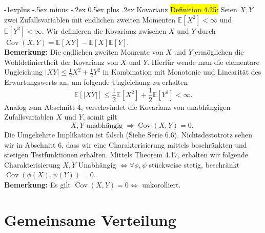 \documentclass[10pt,landscape]{article}
\makeatletter
\newcommand{\blue}[1]{\sethlcolor{cyan} \hl{#1}}
\renewcommand{\subsection}{\@startsection{subsection}{1}{0mm}%
                                {-1ex plus -.5ex minus -.2ex}%
                                {0.5ex plus .2ex}%
                                {\normalfont\large\bfseries}}
\renewcommand{\subsection}{\@startsection{subsection}{2}{0mm}%
                                {-1explus -.5ex minus -.2ex}%
                                {0.5ex plus .2ex}%
                                {\normalfont\normalsize\bfseries}}
\makeatother
\begin{document}
\begin{multicols}{3}
\subsection{Kovarianz}
\blue{Definition 4.25:} Seien $X, Y$ zwei Zufallsvariablen mit endlichen zweiten Momenten $\mathbb{E}\left[X^{2}\right]<\infty$ und $\mathbb{E}\left[Y^{2}\right]<\infty$. Wir definieren die Kovarianz zwischen $X$ und $Y$ durch
$\operatorname{Cov}(X, Y)=\mathbb{E}[X Y]-\mathbb{E}[X] \mathbb{E}[Y]$. \\
\textbf{Bemerkung:} Die endlichen zweiten Momente von $X$ und $Y$ ermöglichen die Wohldefiniertheit der Kovarianz von $X$ und $Y$. Hierfür wende man die elementare Ungleichung $|X Y| \leq \frac{1}{2} X^{2}+\frac{1}{2} Y^{2}$ in Kombination mit Monotonie und Linearität des Erwartungswerts an, um folgende Ungleichung zu erhalten
$$
\mathbb{E}[|X Y|] \leq \frac{1}{2} \mathbb{E}\left[X^{2}\right]+\frac{1}{2} \mathbb{E}\left[Y^{2}\right]<\infty .
$$
Analog zum Abschnitt 4, verschwindet die Kovarianz von unabhängigen Zufallsvariablen $X$ und $Y$, somit gilt
$$
X, Y \text { unabhängig } \Longrightarrow \operatorname{Cov}(X, Y)=0 \text {. }
$$
Die Umgekehrte Implikation ist falsch (Siehe Serie 6.6). Nichtsdestotrotz sehen wir in Abschnitt 6, dass wir eine Charakterisierung mittels beschränkten und stetigen Testfunktionen erhalten. Mittels Theorem 4.17, erhalten wir folgende Charakterisierung
$X, Y$ Unabhängig $\Longleftrightarrow \forall \phi, \psi$ stückweise stetig, beschränkt $\operatorname{Cov}(\phi(X), \psi(Y))=0$. \\
\textbf{Bemerkung: } Es gilt $\operatorname{Cov}(X, Y)=0 \Longleftrightarrow \text{ unkorolliert}$.
\section{Gemeinsame Verteilung}

\end{multicols}
\end{document}
